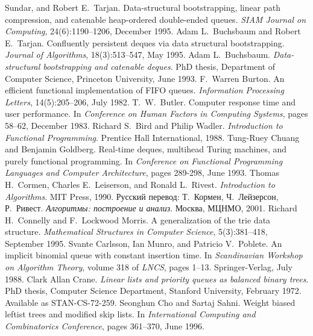 \begin{thebibliography}{XXXXXXX}
  Sundar, and Robert E.~Tarjan. Data-structural bootstrapping, linear
  path compression, and catenable heap-ordered double-ended
  queues. \textit{SIAM Journal on Computing}, 24(6):1190--1206,
  December 1995.
 Adam L.~Buchsbaum and
  Robert E.~Tarjan. Confluently persistent deques via data structural
  bootstrapping. \textit{Journal of Algorithms}, 18(3):513--547, May 1995.
  Adam L.~Buchsbaum. \textit{Data-structural bootstrapping and
    catenable deques}. PhD thesis, Department of Computer Science,
  Princeton University, June 1993.
 F.~Warren Burton. An efficient functional
  implementation of FIFO queues. \textit{Information Processing
    Letters}, 14(5):205--206, July 1982.
 T.~W.~Butler. Computer response time and
  user performance. In \textit{Conference on Human Factors in
    Computing Systems}, pages 58--62, December 1983.
 Richard S.~Bird and Philip
  Wadler. \textit{Introduction to Functional Programming}. Prentice
  Hall International, 1988.
 Tung-Ruey Chuang and Benjamin
  Goldberg. Real-time deques, multihead Turing machines, and purely
  functional programming. In \textit{Conference on Functional
    Programming Languages and Computer Architecture}, pages 289-298,
  June 1993.
 Thomas H.~Cormen, Charles
  E.~Leiserson, and Ronald L.~Rivest. \textit{Introduction to
    Algorithms}. MIT Press, 1990. Русский перевод: Т.~Кормен,
  Ч.~Лейзерсон, Р.~Ривест. \textit{Алгоритмы: построение и
    анализ}. Москва, МЦНМО, 2001.
 Richard H.~Connelly and F.~Lockwood
  Morris. A generalization of the trie data
  structure. \textit{Mathematical Structures in Computer Science},
  5(3):381--418, September 1995.
 Svante Carlsson, Ian Munro,
  and Patricio V.~Poblete. An implicit binomial queue with constant
  insertion time. In \textit{Scandinavian Workshop on Algorithm
    Theory}, volume 318 of \textit{LNCS}, pages
  1--13. Springer-Verlag, July 1988.
 Clark Allan Crane. \textit{Linear lists and
  priority queues as balanced binary trees}. PhD thesis, Computer
Science Department, Stanford University, February 1972. Available as STAN-CS-72-259.
 Seonghun Cho and Sartaj Sahni. Weight
  biased leftist trees and modified skip lists. In
  \textit{International Computing and Combinatorics Conference}, pages
  361--370, June 1996.

\end{thebibliography}
